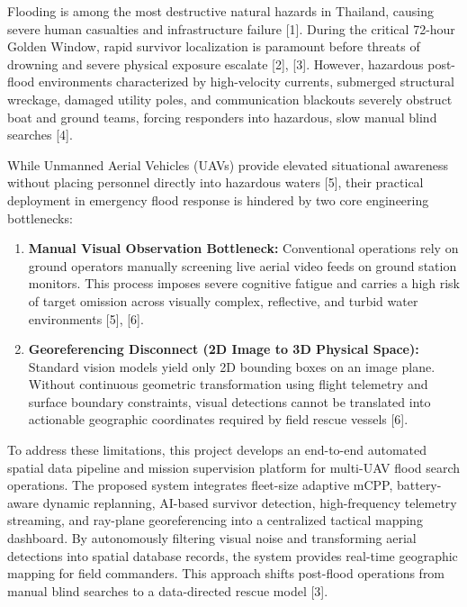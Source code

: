 \documentclass[12pt]{article}
\newcommand{\headerfont}{\fontsize{18pt}{21.6pt}\selectfont}
\newcommand{\infofont}{\fontsize{16pt}{19.2pt}\selectfont}
\newcommand{\SubHead}[1]{\vspace{1em}\noindent{\headerfont\bfseries #1}\vspace{0.3em}\par}
\newenvironment{infoenumerate}{\infofont\begin{enumerate}[leftmargin=1.5em]}{\end{enumerate}}
\begin{document}
\SubHead{1.1 Project introduce \& problem statement}
\infofont
Flooding is among the most destructive natural hazards in Thailand, causing severe
human casualties and infrastructure failure [1]. During the critical 72-hour Golden Window,
rapid survivor localization is paramount before threats of drowning and severe physical
exposure escalate [2], [3]. However, hazardous post-flood environments characterized by
high-velocity currents, submerged structural wreckage, damaged utility poles, and
communication blackouts severely obstruct boat and ground teams, forcing responders into
hazardous, slow manual blind searches [4].

While Unmanned Aerial Vehicles (UAVs) provide elevated situational awareness without
placing personnel directly into hazardous waters [5], their practical deployment in emergency
flood response is hindered by two core engineering bottlenecks:

\begin{infoenumerate}
\item \textbf{Manual Visual Observation Bottleneck:} Conventional operations rely on ground
operators manually screening live aerial video feeds on ground station monitors. This process
imposes severe cognitive fatigue and carries a high risk of target omission across visually
complex, reflective, and turbid water environments [5], [6].
\item \textbf{Georeferencing Disconnect (2D Image to 3D Physical Space):} Standard vision
models yield only 2D bounding boxes on an image plane. Without continuous geometric
transformation using flight telemetry and surface boundary constraints, visual detections
cannot be translated into actionable geographic coordinates required by field rescue vessels [6].
\end{infoenumerate}

To address these limitations, this project develops an end-to-end automated spatial
data pipeline and mission supervision platform for multi-UAV flood search operations. The
proposed system integrates fleet-size adaptive mCPP, battery-aware dynamic replanning,
AI-based survivor detection, high-frequency telemetry streaming, and ray-plane georeferencing
into a centralized tactical mapping dashboard. By autonomously filtering visual noise and
transforming aerial detections into spatial database records, the system provides real-time
geographic mapping for field commanders. This approach shifts post-flood operations from
manual blind searches to a data-directed rescue model [3].
\end{document}
